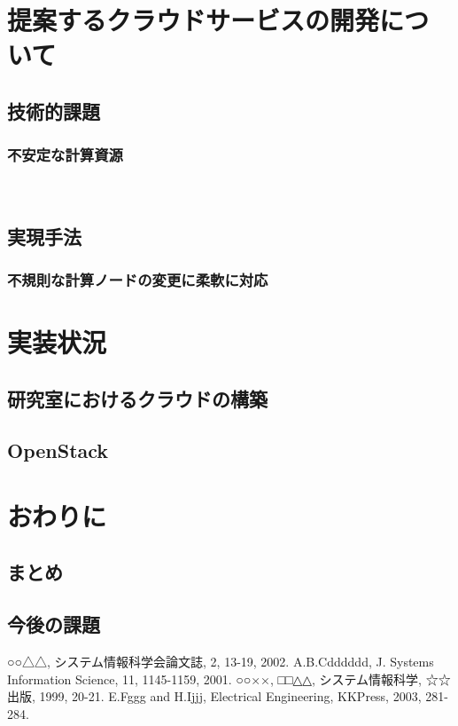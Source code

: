 \section{提案するクラウドサービスの開発について}
\subsection{技術的課題}
\subsubsection{不安定な計算資源}
\subsection{実現手法}
\subsubsection{不規則な計算ノードの変更に柔軟に対応}
\section{実装状況}
\subsection{研究室におけるクラウドの構築}
\subsection{OpenStack}

\section{おわりに}
\subsection{まとめ}
\subsection{今後の課題}

\begin{thebibliography}{99}
	○○△△, システム情報科学会論文誌, 2, 13-19, 2002.
	A.B.Cdddddd, J. Systems Information Science, 11, 1145-1159, 2001.
	○○××, □□△△, システム情報科学, ☆☆出版, 1999, 20-21.
	E.Fggg and H.Ijjj, Electrical Engineering, KKPress, 2003, 281-284.
\end{thebibliography}

%
%
